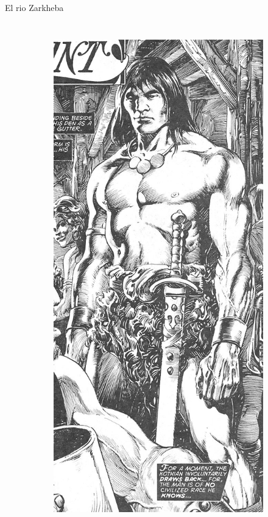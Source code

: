 \begin{frame}{El rio Zarkheba}
\begin{columns}
\begin{figure}[htp]
\begin{subfigure}[b]{0.23\textwidth}
				\includegraphics[width=\textwidth]{img/conan/TSSC}
			\end{subfigure}
		\end{figure}
	\end{columns}
\end{frame}
\note[itemize]{
	\item
}

